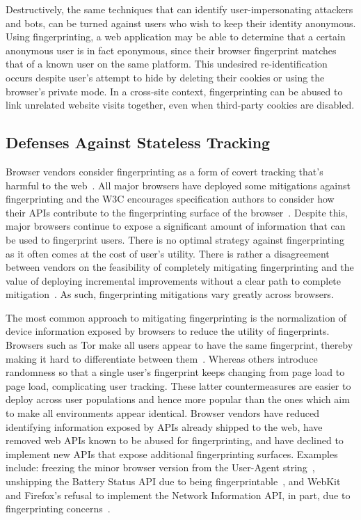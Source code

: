Destructively, the same techniques that can identify user-impersonating attackers and bots, can be turned against users who wish to keep their identity anonymous. 
%
Using fingerprinting, a web application may be able to determine that a certain anonymous user is in fact eponymous, since their browser fingerprint matches that of a known user on the same platform. 
%
This undesired re-identification occurs despite user's attempt to hide by deleting their cookies or using the browser's private mode. 
%
In a cross-site context, fingerprinting can be abused to link unrelated website visits together, even when third-party cookies are disabled.



\subsection{Defenses Against Stateless Tracking}
\label{sec:stateless-defenses}


Browser vendors consider fingerprinting as a form of covert tracking that’s harmful to the web~\cite{nottinghamUnsanctionedWebTracking2015}. 
%
All major browsers have deployed some mitigations against fingerprinting and the W3C encourages specification authors to consider how their APIs contribute to the fingerprinting surface of the browser~\cite{dotyMitigatingBrowserFingerprinting2019}. 
%
Despite this, major browsers continue to expose a significant amount of information that can be used to fingerprint users.
%
There is no optimal strategy against fingerprinting as it often comes at the cost of user's utility. 
%
There is rather a disagreement between vendors on the feasibility of completely mitigating fingerprinting and the value of deploying incremental improvements without a clear path to complete mitigation~\cite{snyderBraveFingerprintingPrivacy2019, rescorlaTechnicalCommentsPrivacy2021}. 
%
As such, fingerprinting mitigations vary greatly across browsers.

The most common approach to mitigating fingerprinting is the normalization of device information exposed by browsers to reduce the utility of fingerprints. 
%
Browsers such as Tor make all users appear to have the same fingerprint, thereby making it hard to differentiate between them~\cite{perryDesignImplementationTor2013}. 
%
Whereas others introduce randomness so that a single user's fingerprint keeps changing from page load to page load, complicating user tracking. 
%
These latter countermeasures are easier to deploy across user populations and hence more popular than the ones which aim to make all environments appear identical.
%
Browser vendors have reduced identifying information exposed by APIs already shipped to the web, have removed web APIs known to be abused for fingerprinting, and have declined to implement new APIs that expose additional fingerprinting surfaces. 
Examples include: freezing the minor browser version from the User-Agent string~\cite{weissIntentDeprecateFreeze2020}, unshipping the Battery Status API due to being fingerprintable~\cite{olejnikBatteryStatusNot2017}, and WebKit and Firefox’s refusal to implement the Network Information API, in part, due to fingerprinting concerns~\cite{TrackingPreventionWebKit2020, thomsonNetworkInformationAPI2018}.


